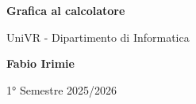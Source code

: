 \begin{titlepage}
	\begin{center}
		\vspace*{1cm}

		\Huge
		\textbf{Grafica al calcolatore}

		\vspace{0.5cm}
		\LARGE
		UniVR - Dipartimento di Informatica

		\vspace{1.5cm}

		\textbf{Fabio Irimie}

		\vfill


		\vspace{0.8cm}


		1° Semestre 2025/2026

	\end{center}
\end{titlepage}
